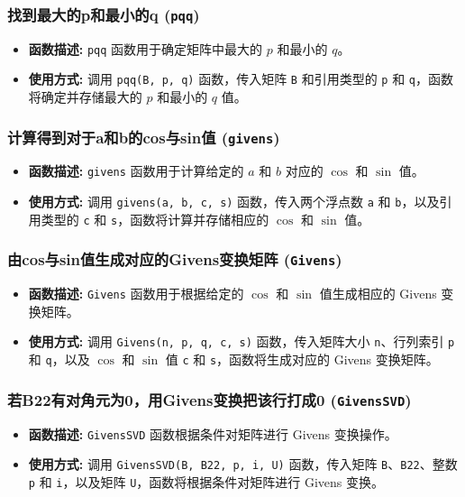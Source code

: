 \documentclass{article}
\begin{document}
\subsubsection*{找到最大的p和最小的q (\texttt{pqq})}
\begin{itemize}
	\item \textbf{函数描述:} \texttt{pqq} 函数用于确定矩阵中最大的 $p$ 和最小的 $q$。
	\item \textbf{使用方式:} 调用 \texttt{pqq(B, p, q)} 函数，传入矩阵 \texttt{B} 和引用类型的 \texttt{p} 和 \texttt{q}，函数将确定并存储最大的 $p$ 和最小的 $q$ 值。
\end{itemize}

\subsubsection*{计算得到对于a和b的cos与sin值 (\texttt{givens})}
\begin{itemize}
	\item \textbf{函数描述:} \texttt{givens} 函数用于计算给定的 $a$ 和 $b$ 对应的 $\cos$ 和 $\sin$ 值。
	\item \textbf{使用方式:} 调用 \texttt{givens(a, b, c, s)} 函数，传入两个浮点数 \texttt{a} 和 \texttt{b}，以及引用类型的 \texttt{c} 和 \texttt{s}，函数将计算并存储相应的 $\cos$ 和 $\sin$ 值。
\end{itemize}

\subsubsection*{由cos与sin值生成对应的Givens变换矩阵 (\texttt{Givens})}
\begin{itemize}
	\item \textbf{函数描述:} \texttt{Givens} 函数用于根据给定的 $\cos$ 和 $\sin$ 值生成相应的 Givens 变换矩阵。
	\item \textbf{使用方式:} 调用 \texttt{Givens(n, p, q, c, s)} 函数，传入矩阵大小 \texttt{n}、行列索引 \texttt{p} 和 \texttt{q}，以及 $\cos$ 和 $\sin$ 值 \texttt{c} 和 \texttt{s}，函数将生成对应的 Givens 变换矩阵。
\end{itemize}

\subsubsection*{若B22有对角元为0，用Givens变换把该行打成0 (\texttt{GivensSVD})}
\begin{itemize}
	\item \textbf{函数描述:} \texttt{GivensSVD} 函数根据条件对矩阵进行 Givens 变换操作。
	\item \textbf{使用方式:} 调用 \texttt{GivensSVD(B, B22, p, i, U)} 函数，传入矩阵 \texttt{B}、\texttt{B22}、整数 \texttt{p} 和 \texttt{i}，以及矩阵 \texttt{U}，函数将根据条件对矩阵进行 Givens 变换。
\end{itemize}
\end{document}
